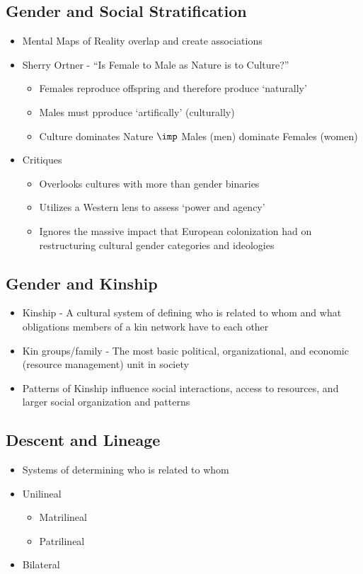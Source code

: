 \documentclass[a4paper]{article}
\begin{document}
\subsection{Gender and Social Stratification} \begin{itemize}
  \item Mental Maps of Reality overlap and create associations
\end{itemize}
\begin{itemize}
  \item Sherry Ortner - ``Is Female to Male as Nature is to Culture?''
  \begin{itemize}
    \item Females reproduce offspring and therefore produce `naturally'
    \item Males must pproduce `artifically' (culturally)
    \item Culture dominates Nature $\imp$ Males (men) dominate Females (women)
  \end{itemize}
\item Critiques
\begin{itemize}
    \item Overlooks cultures with more than gender binaries
    \item Utilizes a Western lens to assess `power and agency'
    \item Ignores the massive impact that European colonization had on restructuring cultural gender categories and ideologies
  \end{itemize}
\end{itemize}

\subsection{Gender and Kinship}
\begin{itemize}
  \item Kinship - A cultural system of defining who is related to whom and what obligations members of a kin network have to each other
  \item Kin groups/family - The most basic political, organizational, and economic (resource management) unit in society
  \item Patterns of Kinship influence social interactions, access to resources, and larger social organization and patterns
\end{itemize}

\subsection{Descent and Lineage}
\begin{itemize}
  \item Systems of determining who is related to whom
  \item Unilineal \begin{itemize}
    \item Matrilineal
    \item Patrilineal
  \end{itemize}
  \item Bilateral
\end{itemize}
\end{document}

